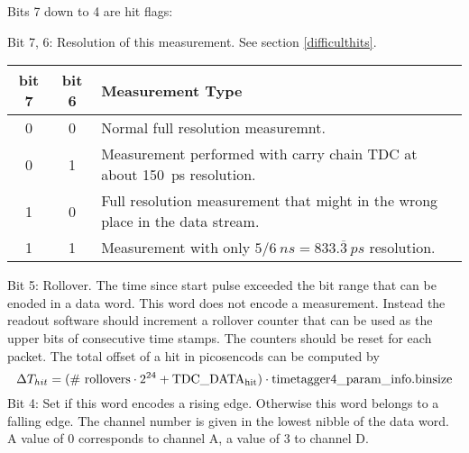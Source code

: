 	\label{flags}
	Bits 7 down to 4 are hit flags:\par
	 {
		Bit 7, 6: Resolution of this measurement. See section \ref{difficulthits}.\\
		\noindent
		\begin{small}
		\begin{tabular}{|c|c||l|}
			\hline
			bit 7 & bit 6 & Measurement Type \\\hline\hline
			0 & 0 &  Normal full resolution measuremnt.\\\hline
			0 & 1 &  Measurement performed with carry chain TDC at about 150~ps resolution.\\\hline
			1 & 0 &  Full resolution measurement that might in the wrong place in the data stream.\\\hline
			1 & 1 &  Measurement with only $5/6~ns = 833.\overline{3}~ps$ resolution. \\\hline
		\end{tabular}
		\end{small}
		
	}
	Bit 5: Rollover. The time since start pulse exceeded the  bit range that can be enoded in a data word. This word does not encode a measurement. 
	Instead the readout software should increment a rollover counter that can be used as the upper bits of consecutive time stamps.  The counters should be reset for each packet.
	The total offset of a hit in picosencods can be computed by
	\[	\Delta T_{hit} = \mathrm{(\#\ rollovers \cdot 2^{\itett{23}{24}} + TDC\_ DATA_{hit}) \cdot timetagger4\_param\_info.binsize} \]
	\indent
	Bit 4: Set if this word encodes a rising edge. Otherwise this word belongs to a falling edge.
	The channel number is given in the lowest nibble of the data word. A value of 0 corresponds to channel A, a value of 3 to channel D.\par
